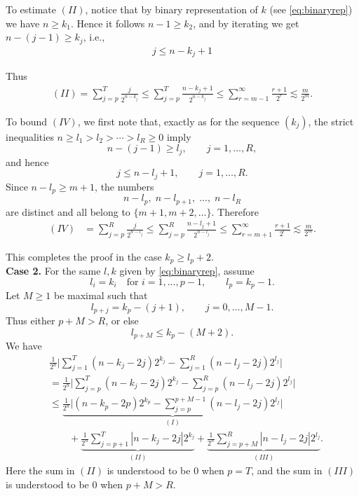 \documentclass[11pt]{amsart}
\theoremstyle{definition}
\renewcommand{\1}{{\mathbbm{1}}}
\begin{document}
To estimate $(II)$, notice that by binary representation of $k$ (see \eqref{eq:binaryrep}) we have $n\geq k_1$. Hence it follows  $n-1\geq k_2$, and by iterating we get  $n-(j-1)\geq k_j$, i.e., 
\begin{align}\label{iter01}
    j \leq n-k_{j}+1
\end{align}


Thus
\begin{align*}
(II)
=\sum_{j=p}^{T}\frac{j}{2^{n-k_j}}\le \sum_{j=p}^{T}\frac{n-k_j+1}{2^{n-k_j}} \le \sum_{r=m-1}^{\infty}\frac{r+1}{2^r}
\lesssim \frac{m}{2^m}.
\end{align*}

To bound $(IV)$, we first note that, exactly as for the sequence $(k_j)$, the
strict inequalities
$
n\ge l_1>l_2>\cdots>l_R\ge 0
$ 
imply
\[
n-(j-1)\ge l_j,\qquad j=1,\dots,R,
\]
and hence
\begin{equation}\label{iter01-l}
j\le n-l_j+1,\qquad j=1,\dots,R.
\end{equation}
Since $n-l_p\ge m+1$, the numbers
\[
n-l_p,\;n-l_{p+1},\;\dots,\;n-l_R
\]
are distinct and all belong to $\{m+1,m+2,\dots\}$. Therefore
\begin{align*}
(IV)
&=\sum_{j=p}^{R}\frac{j}{2^{n-l_j}}
\le \sum_{j=p}^{R}\frac{n-l_j+1}{2^{n-l_j}} \le \sum_{r=m+1}^{\infty}\frac{r+1}{2^r}
\lesssim \frac{m}{2^m}.
\end{align*}

This completes the proof in the case $k_p\geq l_p+2$.\\

\textbf{Case 2.} For the same $l,k$ given by \eqref{eq:binaryrep}, assume
\[
l_i=k_i \quad\text{for } i=1,\dots,p-1,
\qquad
l_p=k_p-1.
\]
Let $M\ge 1$ be maximal such that
\[
l_{p+j}=k_p-(j+1),\qquad j=0,\dots,M-1.
\]
Thus either $p+M>R$, or else
\[
l_{p+M}\le k_p-(M+2).
\]
We have
\begin{align*}
     &\frac{1}{{2^n}}
    \Big|
    \sum_{j=1}^{T}(n - k_j- 2j  )2^{k_j}
    -\sum_{j=1}^{R}( n - l_j- 2j )2^{l_j}
    \Big|\\
    &=\frac{1}{{2^n}}
    \Big|
    \sum_{j=p}^{T}(n - k_j- 2j  )2^{k_j}
    -\sum_{j=p}^{R}( n - l_j- 2j )2^{l_j}
    \Big|\\
    &\leq 
    \underbrace{
    \frac{1}{2^n}\Big|
    (n-k_p-2p){2^{k_p}} - \sum_{j=p}^{p+M-1} (n-l_j -2j) 2^{l_j}
    \Big|}_{(I)}\\
    &\qquad+
    \underbrace{
    \frac{1}{2^n}\sum_{j=p+1}^{T} |n-k_j -2j|2^{k_j} 
    }_{(II)}
    +
    \underbrace{
    \frac{1}{2^n} \sum_{j=p+M}^{R} |n-l_j-2j|2^{l_j}
    }_{(III)}.
\end{align*}
Here the sum in $(II)$ is understood to be $0$ when $p=T$, and the sum in
$(III)$ is understood to be $0$ when $p+M>R$.
\end{document}
